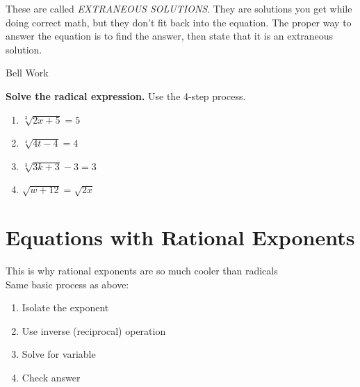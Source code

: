 \documentclass[12pt]{article}
\begin{document}
These are called \textit{EXTRANEOUS SOLUTIONS}. They are solutions you get while doing correct math, but they don't fit back into the equation. The proper way to answer the equation is to find the answer, then state that it is an extraneous solution. 

\pagebreak

\begin{center}
	\begin{Large}
		Bell Work\\
	\end{Large}
\end{center}

\textbf{Solve the radical expression.} Use the 4-step process.\\

\begin{enumerate}

	\item $\sqrt[3]{2x+5}=5$\\
	
	
	\item $\sqrt[4]{4t-4}=4$\\
	
	
	\item $\sqrt[3]{3k+3}-3=3$\\
	
	
	\item $\sqrt{w+12}=\sqrt{2x}$\\
\end{enumerate}

\pagebreak

\section{Equations with Rational Exponents}

This is why rational exponents are so much cooler than radicals\\

Same basic process as above:

\begin{enumerate}

	\item Isolate the exponent
	
	\item Use inverse (reciprocal) operation
	
	\item Solve for variable
	
	\item Check answer
\end{enumerate}
\end{document}
